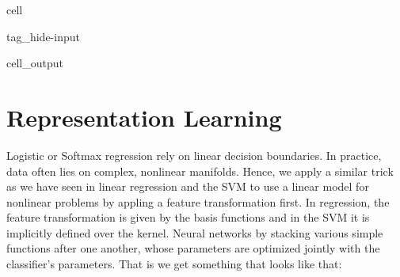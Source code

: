 \documentclass[letterpaper,10pt,english]{jupyterBook}
\begin{document}
\begin{sphinxuseclass}{cell}
\begin{sphinxuseclass}{tag_hide-input}\begin{sphinxVerbatimOutput}

\begin{sphinxuseclass}{cell_output}
\noindent{}

\end{sphinxuseclass}\end{sphinxVerbatimOutput}

\end{sphinxuseclass}
\end{sphinxuseclass}

\section{Representation Learning}
\label{\detokenize{neuralnets_intro:representation-learning}}
\sphinxAtStartPar
Logistic or Softmax regression rely on linear decision boundaries. In practice, data often lies on complex, nonlinear manifolds. Hence, we apply a similar trick as we have seen in linear regression and the SVM to use a linear model for nonlinear problems by appling a feature transformation first. In regression, the feature transformation is given by the basis functions and in the SVM it is implicitly defined over the kernel. Neural networks  by stacking various simple functions after one another, whose parameters are optimized jointly with the classifier’s parameters. That is we get something that looks like that:
\end{document}
